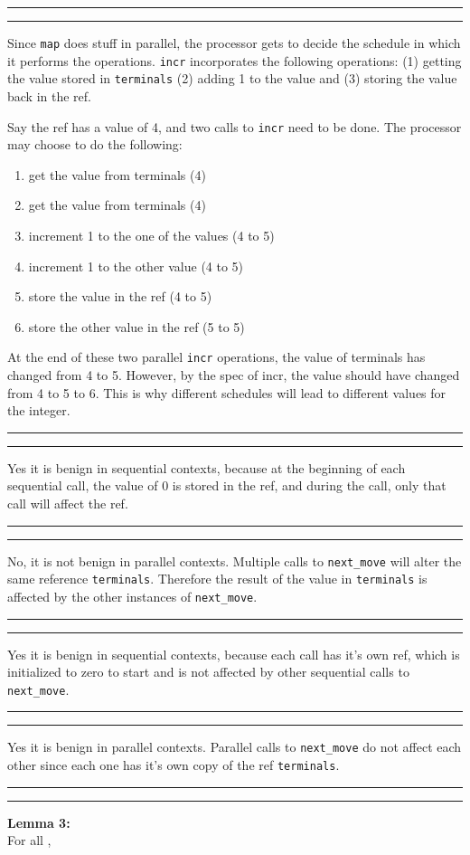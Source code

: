 \documentclass[11pt,letterpaper]{article}
\newcommand{\question}[2] {\vspace{.25in} \hrule\vspace{0.5em}
\noindent{\bf #1: #2} \vspace{0.5em}
\hrule \vspace{.10in}}
\begin{document}
\question{3.1}{}
Since \texttt{map} does stuff in parallel, the processor gets to decide 
the schedule in which it performs the operations. \texttt{incr} incorporates
the following operations: (1) getting the value stored in \texttt{terminals}
(2) adding 1 to the value and (3) storing the value back in the ref.

Say the ref has a value of 4, and two calls to \texttt{incr} need to be done.
The processor may choose to do the following:
\begin{enumerate}
\item get the value from terminals (4)
\item get the value from terminals (4)
\item increment 1 to the one of the values (4 to 5)
\item increment 1 to the other value (4 to 5)
\item store the value in the ref (4 to 5)
\item store the other value in the ref (5 to 5)
\end{enumerate}
At the end of these two parallel \texttt{incr} operations, the value of 
terminals has changed from 4 to 5. However, by the spec of incr,
the value should have changed from 4 to 5 to 6. This is why different schedules
will lead to different values for the integer.

\question{3.2}{}
Yes it is benign in sequential contexts, because at the beginning of each
sequential call, the value of 0 is stored in the ref, and during the call, only 
that call will affect the ref.

\question{3.3}{}
No, it is not benign in parallel contexts. Multiple calls to \texttt{next\_move} will alter
the same reference \texttt{terminals}. Therefore the result of the value 
in \texttt{terminals} is affected by the other instances of \texttt{next\_move}.

\question{3.4}{}
Yes it is benign in sequential contexts, because each call has it's own
ref, which is initialized to zero to start and is not affected by other
sequential calls to \texttt{next\_move}.

\question{3.5}{}
Yes it is benign in parallel contexts. Parallel calls to \texttt{next\_move} do not
affect each other since each one has it's own copy of the ref \texttt{terminals}.

\question{4.1}{}
\textbf{Lemma 3:}\\
For all , \\
\begin{center}\end{center}
\end{document}
